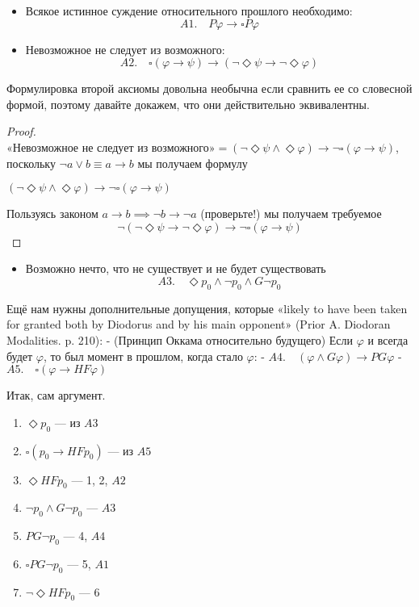 \documentclass[openany]{book}
\theoremstyle{plain}
\theoremstyle{definition}
\begin{document}
\begin{itemize}
\item Всякое истинное суждение относительного прошлого необходимо:
    \[A1. \quad P\varphi \to \square P\varphi \]
\item Невозможное не следует из возможного:
    \[A2. \quad \square(\varphi \to \psi) \to (\neg \Diamond \psi \to \neg \Diamond \varphi)\]
\end{itemize}

Формулировка второй аксиомы довольна необычна если сравнить ее со словесной формой, поэтому давайте докажем, что они действительно эквивалентны.
\begin{proof}

\(\text{«Невозможное не следует из возможного»} = (\neg \Diamond \psi \land \Diamond \varphi) \to \neg \square (\varphi \to \psi)\), поскольку \(\neg a \lor b \equiv a \to b\) мы получаем формулу

\((\neg \Diamond \psi \land \Diamond \varphi) \to \neg \square (\varphi \to \psi)\)

Пользуясь законом \(a \to b \implies \neg b \to \neg a\) (проверьте!) мы получаем требуемое
$$\neg(\neg \Diamond \psi \to \neg \Diamond \varphi) \to \neg \square (\varphi \to \psi)$$
\end{proof}
\begin{itemize}
\item Возможно нечто, что не существует и не будет существовать
    \[A3. \quad \Diamond p_0 \land \neg p_0 \land G\neg p_0\]
 \end{itemize}

Ещё нам нужны дополнительные допущения, которые «likely to have been taken for granted both by Diodorus and by his main opponent» (Prior A. Diodoran Modalities. p. 210):
- (Принцип Оккама относительно будущего) Если \(\varphi\) и всегда будет \(\varphi\), то был момент в прошлом, когда стало \(\varphi\):
    - \(A4. \quad (\varphi \land G \varphi) \to PG\varphi\) 
- \(A5. \quad \square(\varphi \to HF \varphi)\)

Итак, сам аргумент.
\begin{enumerate}
\item \(\Diamond p_0\) — из \(A3\)
\item \(\square(p_0 \to HF p_0)\) — из \(A5\)
\item \(\Diamond HF p_0\) — 1, 2, \(A2\)
\item \(\neg p_0 \land G \neg p_0\) — \(A3\)
\item \(PG \neg p_0\) — 4, \(A4\)
\item \(\square PG \neg p_0\) — 5, \(A1\)
\item \(\neg \Diamond HF p_0\) — 6
\end{enumerate}
\end{document}
